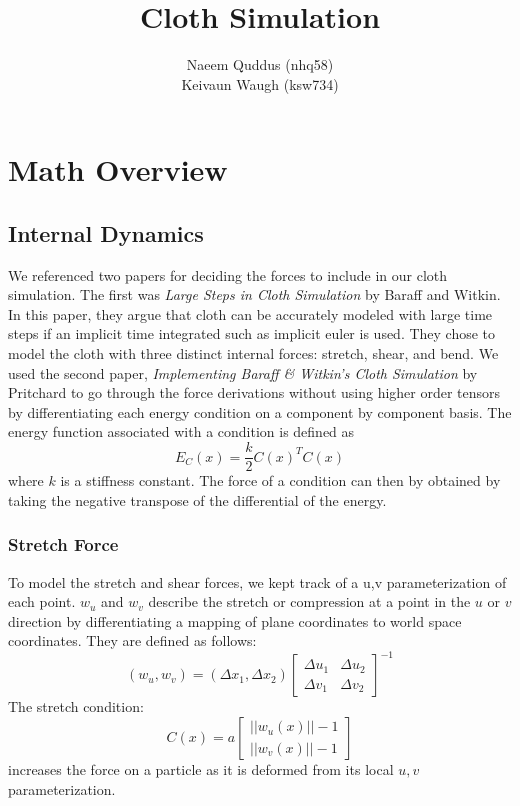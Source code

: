 \documentclass{article}
\begin{document}
\title{Cloth Simulation}
\author{Naeem Quddus (nhq58) \\ Keivaun Waugh (ksw734)}

\maketitle

\section{Math Overview}
    \subsection{Internal Dynamics}
    We referenced two papers for deciding the forces to include in our cloth simulation. The first was \textit{Large Steps in Cloth Simulation} by Baraff and Witkin. In this paper, they argue that cloth can be accurately modeled with large time steps if an implicit time integrated such as implicit euler is used. They chose to model the cloth with three distinct internal forces: stretch, shear, and bend.  We used the second paper, \textit{Implementing Baraff \& Witkin's Cloth Simulation} by Pritchard to go through the force derivations without using higher order tensors by differentiating each energy condition on a component by component basis. The energy function associated with a condition is defined as
    \[
        E_C(x) = \frac{k}{2}C(x)^TC(x)
    \]
    where $k$ is a stiffness constant. The force of a condition can then by obtained by taking the negative transpose of the differential of the energy.
        \subsubsection{Stretch Force}
            To model the stretch and shear forces, we kept track of a u,v parameterization of each point. $w_u$ and $w_v$ describe the stretch or compression at a point in the $u$ or $v$ direction by differentiating a mapping of plane coordinates to world space coordinates. They are defined as follows:
            \[
                (w_u, w_v) = (\Delta x_1, \Delta x_2)
                \begin{bmatrix}
                    \Delta u_1 & \Delta u_2 \\
                    \Delta v_1 & \Delta v_2
                \end{bmatrix}^{-1}
            \]
            The stretch condition:
            \[
                C(x) = a
                \begin{bmatrix}
                     ||w_u(x)|| - 1 \\
                     ||w_v(x)|| - 1
                \end{bmatrix}
            \]
            increases the force on a particle as it is deformed from its local $u,v$ parameterization.
\end{document}
